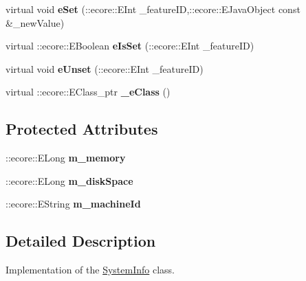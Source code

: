 \begin{DoxyCompactItemize}
\item 
\hypertarget{classIMS__Data_1_1SystemInfo_adacc4615cbc740a11b131b8727907c1e}{
virtual void {\bfseries eSet} (::ecore::EInt \_\-featureID,::ecore::EJavaObject const \&\_\-newValue)}
\label{classIMS__Data_1_1SystemInfo_adacc4615cbc740a11b131b8727907c1e}

\item 
\hypertarget{classIMS__Data_1_1SystemInfo_a3a99375b7ce5d4eb578553b2bd632848}{
virtual ::ecore::EBoolean {\bfseries eIsSet} (::ecore::EInt \_\-featureID)}
\label{classIMS__Data_1_1SystemInfo_a3a99375b7ce5d4eb578553b2bd632848}

\item 
\hypertarget{classIMS__Data_1_1SystemInfo_af8f49e33781bd933d03dfc2062ed54f2}{
virtual void {\bfseries eUnset} (::ecore::EInt \_\-featureID)}
\label{classIMS__Data_1_1SystemInfo_af8f49e33781bd933d03dfc2062ed54f2}

\item 
\hypertarget{classIMS__Data_1_1SystemInfo_a577d1bb6b50f6fb695085382301c3884}{
virtual ::ecore::EClass\_\-ptr {\bfseries \_\-eClass} ()}
\label{classIMS__Data_1_1SystemInfo_a577d1bb6b50f6fb695085382301c3884}

\end{DoxyCompactItemize}
\subsection*{Protected Attributes}
\begin{DoxyCompactItemize}
\item 
\hypertarget{classIMS__Data_1_1SystemInfo_a85b38acb188b215b3253e72960cba041}{
::ecore::ELong {\bfseries m\_\-memory}}
\label{classIMS__Data_1_1SystemInfo_a85b38acb188b215b3253e72960cba041}

\item 
\hypertarget{classIMS__Data_1_1SystemInfo_a6120f833641add021d0123bebadebac6}{
::ecore::ELong {\bfseries m\_\-diskSpace}}
\label{classIMS__Data_1_1SystemInfo_a6120f833641add021d0123bebadebac6}

\item 
\hypertarget{classIMS__Data_1_1SystemInfo_a1bff82388c9fdcab318c20e82ec32afb}{
::ecore::EString {\bfseries m\_\-machineId}}
\label{classIMS__Data_1_1SystemInfo_a1bff82388c9fdcab318c20e82ec32afb}

\end{DoxyCompactItemize}


\subsection{Detailed Description}
Implementation of the \hyperlink{classIMS__Data_1_1SystemInfo}{SystemInfo} class. 

